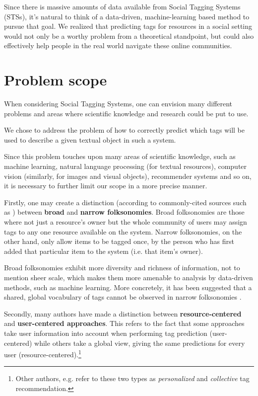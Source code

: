 Since there is massive amounts of data available from Social Tagging Systems (STSs), it's natural to think of a data-driven, machine-learning based method to pursue that goal. We realized that predicting tags for resources in a social setting would not only be a worthy problem from a theoretical standpoint, but could also effectively help people in the real world navigate these online communities.

\section{Problem scope}\label{section:intro_problem}

When considering Social Tagging Systems, one can envision many different problems and areas where scientific knowledge and research could be put to use.

We chose to address the problem of how to correctly predict which tags will be used to describe a given textual object in such a system. 

Since this problem touches upon many areas of scientific knowledge, such as machine learning, natural language processing (for textual resources), computer vision (similarly, for images and visual objects), recommender systems and so on, it is necessary to further limit our scope in a more precise manner.

Firstly, one may create a distinction (according to commonly-cited sources such as \cite{wal_2005_broad_and_narrow}) between \textbf{broad} and \textbf{narrow folksonomies}. Broad folksonomies are those where not just a resource's owner but the whole community of users may assign tags to any one resource available on the system. Narrow folksonomies, on the other hand, only allow items to be tagged once, by the person who has first added that particular item to the system (i.e. that item's owner).

Broad folksonomies exhibit more diversity and richness of information, not to mention sheer scale, which makes them more amenable to analysis by data-driven methods, such as machine learning. More concretely, it has been suggested that a shared, global vocabulary of tags cannot be observed in narrow folksonomies \citep{schifanella_etal_2010}.

Secondly, many authors \citep{illig_etal_2011,song_etal_2011} have made a distinction between \textbf{resource-centered} and \textbf{user-centered approaches}. This refers to the fact that some approaches take user information into account when performing tag prediction (user-centered) while others take a global view, giving the same predictions for every user (resource-centered).\footnote{Other authors, e.g. \cite{zhang_etal_2014} refer to these two types as \textit{personalized} and \textit{collective} tag recommendation.}

